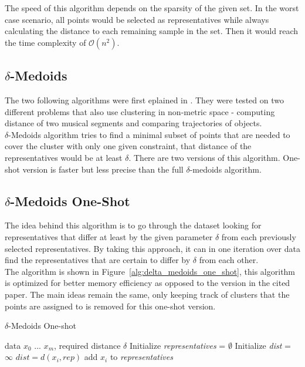 \documentclass[thesis=B,english]{FITthesis}[2012/10/20]
\begin{document}
The speed of this algorithm depends on the sparsity of the given set.
In the worst case scenario, all points would be selected as representatives while always calculating the distance to each remaining sample in the set. Then it would reach the time complexity of $\mathcal{O}(n^2)$.

\subsection{$\delta$-Medoids}\label{subsec:delta_medoids}
The two following algorithms were first eplained in \cite{liebman2015representative}.
They were tested on two different problems that also use clustering in non-metric space - computing distance of two musical segments and comparing trajectories of objects.\\

$\delta$-Medoids algorithm tries to find a minimal subset of points that are needed to cover the cluster with only one given constraint, that distance of the representatives would be at least $\delta$.
There are two versions of this algorithm.
One-shot version is faster but less precise than the full $\delta$-medoids algorithm.

\subsection{$\delta$-Medoids One-Shot}

The idea behind this algorithm is to go through the dataset looking for representatives that differ at least by the given parameter $\delta$ from each previously selected representatives.
By taking this approach, it can in one iteration over data find the representatives that are certain to differ by $\delta$ from each other. \\

The algorithm is shown in Figure~\ref{alg:delta_medoids_one_shot}, this algorithm is optimized for better memory efficiency as opposed to the version in the cited paper.
The main ideas remain the same, only keeping track of clusters that the points are assigned to is removed for this one-shot version.

\begin{algorithm}\label{alg:delta_medoids_one_shot}
    \caption{$\delta$-Medoids One-shot}
    \label{delta_medoids_one_shot}
    \begin{algorithmic}[1]
        \INPUT data $x_0$ ... $x_m$, required distance $\delta$
        \STATE Initialize \textit{representatives} = $\emptyset$
            \STATE Initialize \textit{dist} = $\infty$
                    \STATE $dist = d(x_i, rep)$
                \ENDIF
            \ENDFOR
                \STATE add $x_i$ to \textit{representatives}
            \ENDIF
        \ENDFOR
    \end{algorithmic}
\end{algorithm}
\end{document}
